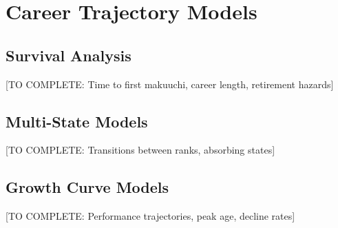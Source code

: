 \section{Career Trajectory Models}

\subsection{Survival Analysis}

[TO COMPLETE: Time to first makuuchi, career length, retirement hazards]

\subsection{Multi-State Models}

[TO COMPLETE: Transitions between ranks, absorbing states]

\subsection{Growth Curve Models}

[TO COMPLETE: Performance trajectories, peak age, decline rates]